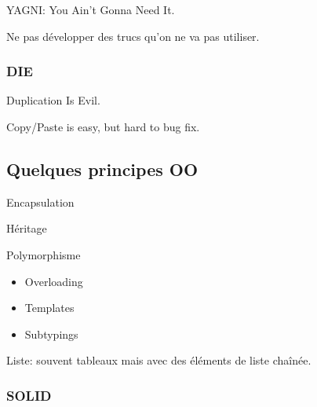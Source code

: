 \documentclass[a4paper,11pt]{article}
\begin{document}
YAGNI: You Ain't Gonna Need It.

Ne pas développer des trucs qu'on ne va pas utiliser.

\subsubsection{DIE}

Duplication Is Evil.

Copy/Paste is easy, but hard to bug fix.

\subsection{Quelques principes OO}

Encapsulation

Héritage

Polymorphisme

\begin{itemize}
\item Overloading
\item Templates
\item Subtypings
\end{itemize}

Liste: souvent tableaux mais avec des éléments de liste chaînée.

\subsubsection{SOLID}
\end{document}

